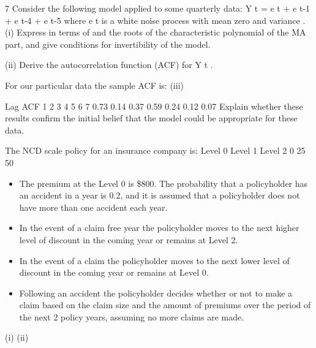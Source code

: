 \documentclass[a4paper,12pt]{article}
\begin{document}
7
Consider the following model applied to some quarterly data:
Y t = e t +  e t-1 +  e t-4 +   e t-5
where e t is a white noise process with mean zero and variance  .
(i) Express in terms of  and  the roots of the characteristic polynomial of the
MA part, and give conditions for invertibility of the model.

(ii) Derive the autocorrelation function (ACF) for Y t .

For our particular data the sample ACF is:
(iii)



Lag ACF
1
2
3
4
5
6
7 0.73
0.14
0.37
0.59
0.24
0.12
0.07
Explain whether these results confirm the initial belief that the model could be
appropriate for these data.

The NCD scale policy for an insurance company is:
Level 0
Level 1
Level 2
0%
25%
50%
\begin{itemize}
\item The premium at the Level 0 is \$800. The probability that a policyholder has an accident in a year is 0.2, and it is assumed that a policyholder does not have more than one accident each year.
\item In the event of a claim free year the policyholder moves to the next higher level of discount in the coming year or remains at Level 2.
\item In the event of a claim the policyholder moves to the next lower level of discount in the coming year or remains at Level 0.
\item Following an accident the policyholder decides whether or not to make a claim based on the claim size and the amount of premiums over the period of the next 2 policy
years, assuming no more claims are made.
\end{itemize}

(i)
(ii)
\end{document}

